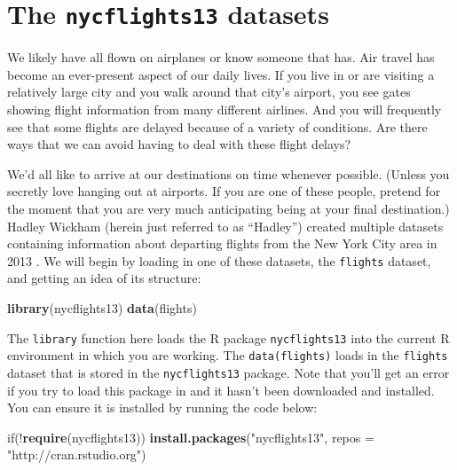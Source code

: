 \documentclass[]{tufte-book}
\newenvironment{Shaded}{\begin{snugshade}}{\end{snugshade}}
\newcommand{\KeywordTok}[1]{\textcolor[rgb]{0.13,0.29,0.53}{\textbf{{#1}}}}
\newcommand{\DataTypeTok}[1]{\textcolor[rgb]{0.13,0.29,0.53}{{#1}}}
\newcommand{\StringTok}[1]{\textcolor[rgb]{0.31,0.60,0.02}{{#1}}}
\newcommand{\NormalTok}[1]{{#1}}
\begin{document}
\section{\texorpdfstring{The \texttt{nycflights13}
datasets}{The nycflights13 datasets}}\label{the-nycflights13-datasets}

We likely have all flown on airplanes or know someone that has. Air
travel has become an ever-present aspect of our daily lives. If you live
in or are visiting a relatively large city and you walk around that
city's airport, you see gates showing flight information from many
different airlines. And you will frequently see that some flights are
delayed because of a variety of conditions. Are there ways that we can
avoid having to deal with these flight delays?

We'd all like to arrive at our destinations on time whenever possible.
(Unless you secretly love hanging out at airports. If you are one of
these people, pretend for the moment that you are very much anticipating
being at your final destination.) Hadley Wickham (herein just referred
to as ``Hadley'') created multiple datasets containing information about
departing flights from the New York City area in 2013
\citep{R-nycflights13}. We will begin by loading in one of these
datasets, the \texttt{flights} dataset, and getting an idea of its
structure:

\begin{Shaded}
\begin{Highlighting}[]
\KeywordTok{library}\NormalTok{(nycflights13)}
\KeywordTok{data}\NormalTok{(flights)}
\end{Highlighting}
\end{Shaded}

The \texttt{library} function here loads the R package
\texttt{nycflights13} into the current R environment in which you are
working. The \texttt{data(flights)} loads in the \texttt{flights}
dataset that is stored in the \texttt{nycflights13} package. Note that
you'll get an error if you try to load this package in and it hasn't
been downloaded and installed. You can ensure it is installed by running
the code below:

\begin{Shaded}
\begin{Highlighting}[]
\NormalTok{if(!}\KeywordTok{require}\NormalTok{(nycflights13))}
  \KeywordTok{install.packages}\NormalTok{(}\StringTok{"nycflights13"}\NormalTok{, }\DataTypeTok{repos =} \StringTok{"http://cran.rstudio.org"}\NormalTok{)}
\end{Highlighting}
\end{Shaded}
\end{document}
